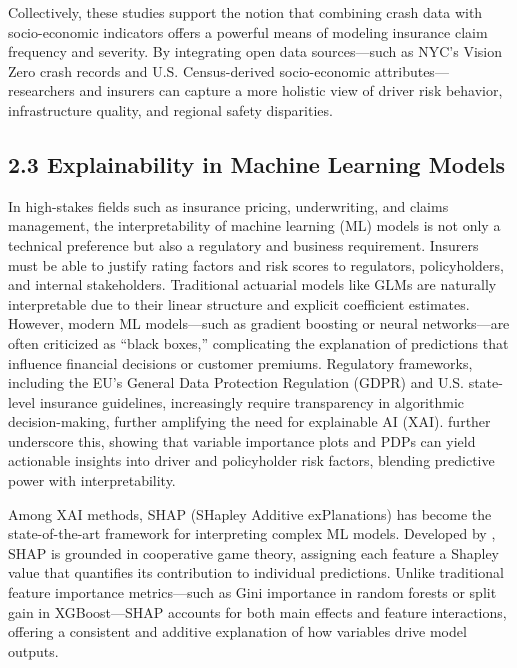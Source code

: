 \documentclass[
  number,
  review,
  3p]{elsarticle}
\begin{document}
Collectively, these studies support the notion that combining crash data
with socio-economic indicators offers a powerful means of modeling
insurance claim frequency and severity. By integrating open data
sources---such as NYC's Vision Zero crash records and U.S.
Census-derived socio-economic attributes---researchers and insurers can
capture a more holistic view of driver risk behavior, infrastructure
quality, and regional safety disparities.

\subsection{\texorpdfstring{\textbf{2.3 Explainability in Machine
Learning
Models}}{2.3 Explainability in Machine Learning Models}}\label{explainability-in-machine-learning-models}

In high-stakes fields such as insurance pricing, underwriting, and
claims management, the interpretability of machine learning (ML) models
is not only a technical preference but also a regulatory and business
requirement. Insurers must be able to justify rating factors and risk
scores to regulators, policyholders, and internal stakeholders.
Traditional actuarial models like GLMs are naturally interpretable due
to their linear structure and explicit coefficient estimates. However,
modern ML models---such as gradient boosting or neural networks---are
often criticized as ``black boxes,'' complicating the explanation of
predictions that influence financial decisions or customer premiums.
Regulatory frameworks, including the EU's General Data Protection
Regulation (GDPR) and U.S. state-level insurance guidelines,
increasingly require transparency in algorithmic decision-making,
further amplifying the need for explainable AI (XAI). \citet{henckaerts}
further underscore this, showing that variable importance plots and PDPs
can yield actionable insights into driver and policyholder risk factors,
blending predictive power with interpretability.

Among XAI methods, SHAP (SHapley Additive exPlanations) has become the
state-of-the-art framework for interpreting complex ML models. Developed
by \citet{lundberg}, SHAP is grounded in cooperative game theory,
assigning each feature a Shapley value that quantifies its contribution
to individual predictions. Unlike traditional feature importance
metrics---such as Gini importance in random forests or split gain in
XGBoost---SHAP accounts for both main effects and feature interactions,
offering a consistent and additive explanation of how variables drive
model outputs.
\end{document}
